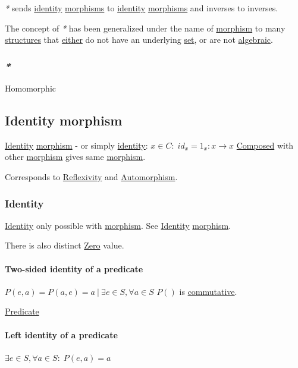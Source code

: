 \documentclass[a4paper,14pt,oneside]{book}
\begin{document}
\emph{*} sends \hyperref[org5f89edb]{identity} \hyperref[orgfb70910]{morphisms} to \hyperref[org5f89edb]{identity} \hyperref[orgfb70910]{morphisms} and inverses to inverses.

The concept of \emph{*} has been generalized under the name of \hyperref[orgcfa41a6]{morphism} to many \hyperref[orgbfc87b3]{structures} that \hyperref[orga12ce59]{either} do not have an underlying \hyperref[org28abdc9]{set}, or are not \hyperref[org80a39b3]{algebraic}.

\subsubsection{\emph{*}}
\label{sec:orgeb72b45}

\label{org9681e70}Homomorphic

\subsection{\label{orge57ba7c}Identity morphism}
\label{sec:org2fd6fb6}
\hyperref[org5f89edb]{Identity} \hyperref[orgcfa41a6]{morphism} - or simply \hyperref[org5f89edb]{identity}: \(x \in C : \; id_{x}=1_{x} : x \to x\)
\hyperref[org6f45998]{Composed} with other \hyperref[orgcfa41a6]{morphism} gives same \hyperref[orgcfa41a6]{morphism}.

Corresponds to \hyperref[org647fba0]{Reflexivity} and \hyperref[orgdd7a986]{Automorphism}.

\subsubsection{\label{org5f89edb}Identity}
\label{sec:org31cd368}
\hyperref[org5f89edb]{Identity} only possible with \hyperref[orgcfa41a6]{morphism}. See \hyperref[org5f89edb]{Identity} \hyperref[orgcfa41a6]{morphism}.

There is also distinct \hyperref[orgafa382e]{Zero} value.

\paragraph{\label{org4eb1ac2}Two-sided identity of a predicate}
\label{sec:orgae44e70}
\(P(e,a)=P(a,e)=a \ | \ \exists e \in S, \forall a \in S\)
\(P()\) is \hyperref[org5aa111e]{commutative}.

\hyperref[org2ee83a4]{Predicate}

\paragraph{\label{orge253ce2}Left identity of a predicate}
\label{sec:orge8b9583}
\(\exists e \in S, \forall a \in S : \; P(e,a)=a\)
\end{document}

